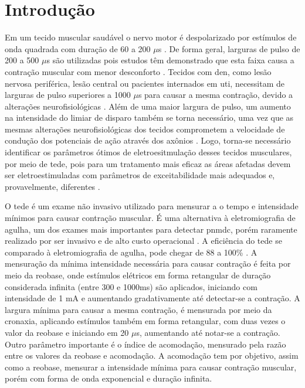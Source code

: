 \section{Introdução}

Em um tecido muscular saudável o nervo motor é despolarizado por estímulos de onda quadrada com duração de 60 a 200 $\mu$s \cite{recoskie}. De forma geral, larguras de pulso de 200 a 500 $\mu$s são utilizadas pois estudos têm demonstrado que esta faixa causa a contração muscular com menor desconforto \cite{deLitto, dantas}. Tecidos com \ac{den}, como lesão nervosa periférica, lesão central ou pacientes internados em \ac{uti}, necessitam de larguras de pulso superiores a 1000 $\mu$s para causar a mesma contração, devido a alterações neurofisiológicas \cite{silvaPE}. Além de uma maior largura de pulso, um aumento na intensidade do limiar de disparo também se torna necessário, uma vez que as mesmas alterações neurofisiológicas dos tecidos comprometem a velocidade de condução dos potenciais de ação através dos axônios \cite{stevens}. Logo, torna-se necessário identificar os parâmetros ótimos de eletroesitmulação desses tecidos musculares, por meio de \ac{tede}, pois para um tratamento mais eficaz as áreas afetadas devem ser eletroestimuladas com parâmetros de exceitabilidade mais adequados e, provavelmente, diferentes \cite{peviani,pieber}.

O \ac{tede} é um exame não invasivo utilizado para mensurar a o tempo e intensidade mínimos para causar contração muscular. É uma alternativa à eletromiografia de agulha, um dos exames mais importantes para detectar \ac{pnmdc}, porém raramente realizado por ser invasivo e de alto custo operacional \cite{schuhfried2005}. A eficiência do \ac{tede} se comparado à eletromiografia de agulha, pode chegar de 88 a 100\% \cite{schuhfried2005}. A mensuração da mínima intensidade necessária para causar contração é feita por meio da reobase, onde estímulos elétricos em forma retangular de duração considerada infinita (entre 300 e 1000ms) são aplicados, iniciando com intensidade de 1 mA e aumentando gradativamente até detectar-se a contração. A largura mínima para causar a mesma contração, é mensurada por meio da cronaxia, aplicando estímulos também em forma retangular, com duas vezes o valor da reobase e iniciando em 20 $\mu$s, aumentando até notar-se a contração. Outro parâmetro importante é o índice de acomodação, mensurado pela razão entre os valores da reobase e acomodação. A acomodação tem por objetivo, assim como a reobase, mensurar a intensidade mínima para causar contração muscular, porém com forma de onda exponencial e duração infinita.

